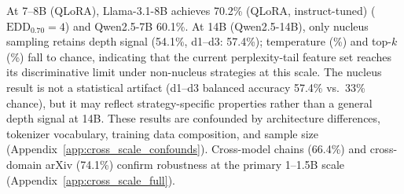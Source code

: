 At 7--8B (QLoRA), Llama-3.1-8B \cite{llama3} achieves 70.2\% (QLoRA, instruct-tuned) ($\mathrm{EDD}_{0.70}{=}4$) and Qwen2.5-7B \cite{qwen2.5} 60.1\%.
At 14B (Qwen2.5-14B), only nucleus sampling retains depth signal (54.1\%, d1--d3: 57.4\%); temperature (\TEMPACCURACY{}\%) and top-$k$ (\TOPKACCURACY{}\%) fall to chance, indicating that the current perplexity-tail feature set reaches its discriminative limit under non-nucleus strategies at this scale.
The nucleus result is not a statistical artifact (d1--d3 balanced accuracy 57.4\% vs.\ 33\% chance), but it may reflect strategy-specific properties rather than a general depth signal at 14B.
These results are confounded by architecture differences, tokenizer vocabulary, training data composition, and sample size (Appendix~\ref{app:cross_scale_confounds}).
Cross-model chains (66.4\%) and cross-domain arXiv (74.1\%) confirm robustness at the primary 1--1.5B scale (Appendix~\ref{app:cross_scale_full}).


